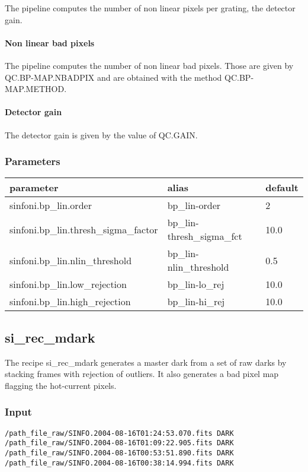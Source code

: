 The pipeline computes the number of non linear
pixels per grating, the detector gain. 

\paragraph{Non linear bad pixels}
The pipeline computes the number of non linear bad pixels. Those are given
by QC.BP-MAP.NBADPIX and are obtained with the method QC.BP-MAP.METHOD.

\paragraph{Detector gain}
The detector gain is given by the value of QC.GAIN.


\subsubsection{Parameters}
\begin{longtable}{|*3{l|}}
\hline
parameter                                 & alias                      & default \\
\hline
sinfoni.bp\_lin.order                     & bp\_lin-order              & 2
     \\
sinfoni.bp\_lin.thresh\_sigma\_factor     & bp\_lin-thresh\_sigma\_fct & 10.0   \\
sinfoni.bp\_lin.nlin\_threshold           & bp\_lin-nlin\_threshold    & 0.5   \\
sinfoni.bp\_lin.low\_rejection            & bp\_lin-lo\_rej            & 10.0  \\
sinfoni.bp\_lin.high\_rejection           & bp\_lin-hi\_rej            & 10.0  \\
\hline
\end{longtable}


\subsection{si\_rec\_mdark}

The recipe si\_rec\_mdark generates a master dark from a set of raw darks by
stacking frames with rejection of outliers. It also generates a bad pixel map 
flagging the hot-current pixels.

\subsubsection{Input}

\begin{verbatim}
/path_file_raw/SINFO.2004-08-16T01:24:53.070.fits DARK
/path_file_raw/SINFO.2004-08-16T01:09:22.905.fits DARK
/path_file_raw/SINFO.2004-08-16T00:53:51.890.fits DARK
/path_file_raw/SINFO.2004-08-16T00:38:14.994.fits DARK
\end{verbatim}


